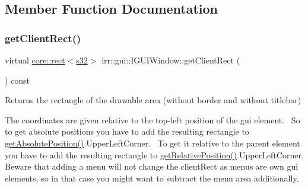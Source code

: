 \subsection{Member Function Documentation}
\mbox{\label{classirr_1_1gui_1_1IGUIWindow_aa6d240eb9d5b9b44c0e45fcef47e6216}} 
\subsubsection{\texorpdfstring{get\+Client\+Rect()}{getClientRect()}\hspace{0.1cm}{\footnotesize\ttfamily [1/2]}}
{\footnotesize\ttfamily virtual \hyperlink{classirr_1_1core_1_1rect}{core\+::rect}$<$\hyperlink{namespaceirr_ac66849b7a6ed16e30ebede579f9b47c6}{s32}$>$ irr\+::gui\+::\+I\+G\+U\+I\+Window\+::get\+Client\+Rect (\begin{DoxyParamCaption}{ }\end{DoxyParamCaption}) const\hspace{0.3cm}{\ttfamily [pure virtual]}}



Returns the rectangle of the drawable area (without border and without titlebar) 

The coordinates are given relative to the top-\/left position of the gui element.~\newline
 So to get absolute positions you have to add the resulting rectangle to \hyperlink{classirr_1_1gui_1_1IGUIElement_a6c5b94dd889533a306a03e25d0998bdf}{get\+Absolute\+Position()}.Upper\+Left\+Corner.~\newline
 To get it relative to the parent element you have to add the resulting rectangle to \hyperlink{classirr_1_1gui_1_1IGUIElement_a056c893bcfe330c9c6058b6027a45cef}{get\+Relative\+Position()}.Upper\+Left\+Corner. Beware that adding a menu will not change the client\+Rect as menus are own gui elements, so in that case you might want to subtract the menu area additionally. \mbox{\label{classirr_1_1gui_1_1IGUIWindow_aa6d240eb9d5b9b44c0e45fcef47e6216}} 
